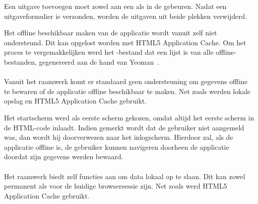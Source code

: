 Een uitgave toevoegen moet zowel aan een  als in de  gebeuren.
Nadat een uitgaveformulier is verzonden, worden de uitgaven uit beide plekken verwijderd.

Het offline beschikbaar maken van de applicatie wordt vanuit \kendo{} zelf niet ondersteund.
Dit kan opgelost worden met HTML5 Application Cache.
Om het proces te vergemakkelijken werd het -bestand dat een lijst is van alle offline-bestanden, gegenereerd aan de hand van Yeoman~\cite{Yeoman2013}.

\paragraph{\jqm}
Vanuit het raamwerk komt er standaard geen ondersteuning om gegevens offline te bewaren of de applicatie offline beschikbaar te maken.
Net zoals \kendo{} werden lokale opslag en HTML5 Application Cache gebruikt.

Het startscherm werd als eerste scherm gekozen, omdat \jqm{} altijd het eerste scherm in de HTML-code inlaadt.
Indien gemerkt wordt dat de gebruiker niet aangemeld was, dan wordt hij doorverwezen naar het inlogscherm.
Hierdoor zal, als de applicatie offline is, de gebruiker kunnen navigeren doorheen de applicatie doordat zijn gegevens werden bewaard.

\paragraph{\lungo}
Het raamwerk biedt zelf functies aan om data lokaal op te slaan.
Dit kan zowel permanent als voor de huidige browsersessie zijn.
Net zoals \kendo{} werd HTML5 Application Cache gebruikt.